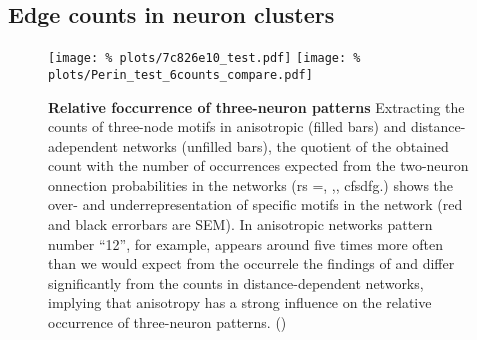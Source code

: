 \subsection*{Edge counts in neuron clusters}


\begin{figure}[H]
  \centering
  \texttt{[image: \%
    plots/7c826e10\_test.pdf]} 
  \texttt{[image: \%
    plots/Perin\_test\_6counts\_compare.pdf]} 
  \captionsetup{skip=8pt}
  \caption{\textbf{Relative foccurrence of three-neuron patterns}
    Extracting the counts of three-node motifs in anisotropic (filled
    bars) and distance-adependent networks (unfilled bars), the
    quotient of the obtained count with the number of occurrences
    expected from the two-neuron onnection probabilities in the
    networks (rs =, ,, cfsdfg.) shows the over- and underrepresentation of
    specific motifs in the network (red and black errorbars are
    SEM). In anisotropic networks pattern number \enquote{12}, for
    example, appears around five times more often than we would expect
    from the occurrele the findings of
    \textcite{Song2005} and differ significantly from the counts in
    distance-dependent networks, implying that anisotropy has a strong
    influence on the relative occurrence of three-neuron
    patterns. () }
  \label{fig:distance_theory_compare}
\end{figure}



